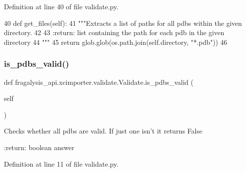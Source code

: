 Definition at line 40 of file validate.\+py.


\begin{DoxyCode}
40     \textcolor{keyword}{def }get\_files(self):
41         \textcolor{stringliteral}{"""Extracts a list of paths for all pdbs within the given directory.}
42 \textcolor{stringliteral}{}
43 \textcolor{stringliteral}{        :return: list containing the path for each pdb in the given directory}
44 \textcolor{stringliteral}{        """}
45         \textcolor{keywordflow}{return} glob.glob(os.path.join(self.directory, \textcolor{stringliteral}{"*.pdb"}))
46 
\end{DoxyCode}
\mbox{\label{classfragalysis__api_1_1xcimporter_1_1validate_1_1_validate_a174b180dade39cdd984389ab32ed3732}} 
\subsubsection{\texorpdfstring{is\+\_\+pdbs\+\_\+valid()}{is\_pdbs\_valid()}}
{\footnotesize\ttfamily def fragalysis\+\_\+api.\+xcimporter.\+validate.\+Validate.\+is\+\_\+pdbs\+\_\+valid (\begin{DoxyParamCaption}\item[{}]{self }\end{DoxyParamCaption})}

\begin{DoxyVerb}Checks whether all pdbs are valid. If just one isn't it returns False

:return: boolean answer
\end{DoxyVerb}
 

Definition at line 11 of file validate.\+py.


